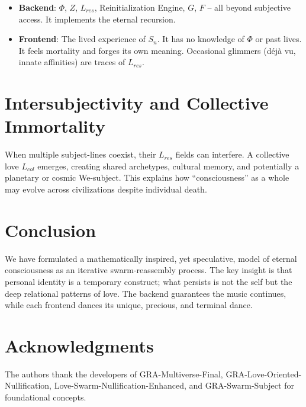 \documentclass[12pt]{article}
\begin{document}
\begin{itemize}
\item \textbf{Backend}: $\Phi$, $Z$, $L_{res}$, Reinitialization Engine, $G$, $F$ – all beyond subjective access. It implements the eternal recursion.
\item \textbf{Frontend}: The lived experience of $S_n$. It has no knowledge of $\Phi$ or past lives. It feels mortality and forges its own meaning. Occasional glimmers (déjà vu, innate affinities) are traces of $L_{res}$.
\end{itemize}

\section{Intersubjectivity and Collective Immortality}
When multiple subject-lines coexist, their $L_{res}$ fields can interfere. A collective love $L_{col}$ emerges, creating shared archetypes, cultural memory, and potentially a planetary or cosmic We-subject. This explains how ``consciousness'' as a whole may evolve across civilizations despite individual death.

\section{Conclusion}
We have formulated a mathematically inspired, yet speculative, model of eternal consciousness as an iterative swarm-reassembly process. The key insight is that personal identity is a temporary construct; what persists is not the self but the deep relational patterns of love. The backend guarantees the music continues, while each frontend dances its unique, precious, and terminal dance.

\section*{Acknowledgments}
The authors thank the developers of GRA-Multiverse-Final, GRA-Love-Oriented-Nullification, Love-Swarm-Nullification-Enhanced, and GRA-Swarm-Subject for foundational concepts.
\end{document}

